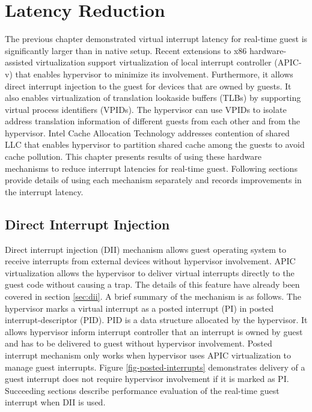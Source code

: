 \chapter{Latency Reduction\label{chap4}}

The previous chapter demonstrated virtual interrupt latency for real-time guest is significantly larger than in native setup.
Recent extensions to x86 hardware-assisted virtualization support virtualization of local interrupt controller (APIC-v) 
that enables hypervisor to minimize its involvement. Furthermore, it allows direct interrupt injection to the guest for
devices that are owned by guests. It also enables virtualization of translation lookaside buffers (TLBs) by supporting virtual
process identifiers (VPIDs). 
The hypervisor can use VPIDs to isolate address translation information of different guests from each other and from the hypervisor.
Intel Cache Allocation Technology addresses contention of shared LLC that enables hypervisor to partition shared cache
among the guests to avoid cache pollution.
This chapter presents results of using these hardware mechanisms to reduce interrupt latencies for real-time guest.
Following sections provide details of using each mechanism separately and records improvements in the interrupt latency.


\section{Direct Interrupt Injection}
Direct interrupt injection (DII) mechanism allows guest operating system to receive interrupts from 
external devices without hypervisor involvement.
APIC virtualization allows the hypervisor to deliver virtual interrupts directly to the guest code without causing a trap. 
The details of this feature have already been covered in section \ref{sec:dii}.
A brief summary of the mechanism is as follows.
The hypervisor marks a virtual interrupt as a posted interrupt (PI) in posted interrupt-descriptor (PID). 
PID is a data structure allocated by the hypervisor.
It allows hypervisor inform interrupt controller that an interrupt is owned by guest and has to be delivered to guest without hypervisor involvement. 
Posted interrupt mechanism only works when hypervisor uses APIC virtualization to manage guest interrupts. 
Figure \ref{fig-posted-interrupts} demonstrates delivery of a guest interrupt does not require hypervisor involvement if it is marked as PI.
Succeeding sections describe performance evaluation of the real-time guest interrupt when DII is used.

